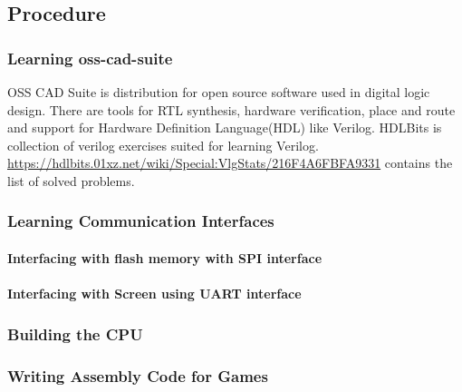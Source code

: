 \documentclass[a4paper,12pt]{article}
\begin{document}
    \subsection{Procedure}

    \subsubsection{Learning oss-cad-suite}
    OSS CAD Suite is distribution for open source software used in digital logic design.
    There are tools for RTL synthesis, hardware verification, place and route and support for Hardware Definition Language(HDL) like Verilog. HDLBits is collection of verilog exercises suited for learning Verilog. \url{https://hdlbits.01xz.net/wiki/Special:VlgStats/216F4A6FBFA9331} contains the list of solved problems. 

    \subsubsection{Learning Communication Interfaces}
    \paragraph{Interfacing with flash memory with SPI interface}
    \paragraph{Interfacing with Screen using UART interface}
    \subsubsection{Building the CPU}
    \subsubsection{Writing Assembly Code for Games}


    \newpage
\end{document}

